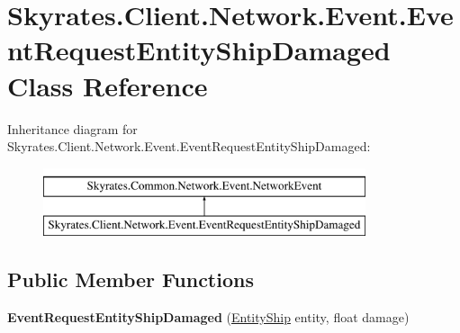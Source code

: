\hypertarget{class_skyrates_1_1_client_1_1_network_1_1_event_1_1_event_request_entity_ship_damaged}{\section{Skyrates.\-Client.\-Network.\-Event.\-Event\-Request\-Entity\-Ship\-Damaged Class Reference}
\label{class_skyrates_1_1_client_1_1_network_1_1_event_1_1_event_request_entity_ship_damaged}
}
Inheritance diagram for Skyrates.\-Client.\-Network.\-Event.\-Event\-Request\-Entity\-Ship\-Damaged\-:\begin{figure}[H]
\begin{center}
\leavevmode
\includegraphics[height=2.000000cm]{class_skyrates_1_1_client_1_1_network_1_1_event_1_1_event_request_entity_ship_damaged}
\end{center}
\end{figure}
\subsection*{Public Member Functions}
\begin{DoxyCompactItemize}
\item 
\hypertarget{class_skyrates_1_1_client_1_1_network_1_1_event_1_1_event_request_entity_ship_damaged_af860cae5aa37075721495e973991ac46}{{\bfseries Event\-Request\-Entity\-Ship\-Damaged} (\hyperlink{class_skyrates_1_1_common_1_1_entity_1_1_entity_ship}{Entity\-Ship} entity, float damage)}\label{class_skyrates_1_1_client_1_1_network_1_1_event_1_1_event_request_entity_ship_damaged_af860cae5aa37075721495e973991ac46}

\end{DoxyCompactItemize}
